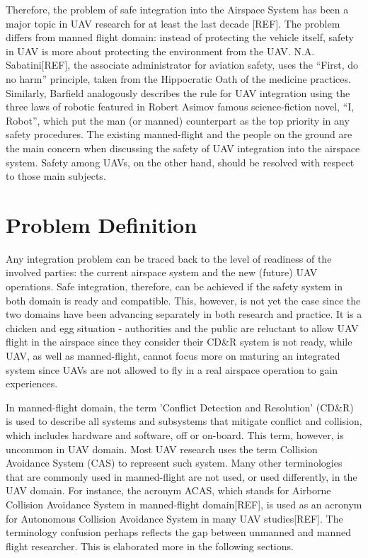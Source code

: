 Therefore, the problem of safe integration into the Airspace System has been a major topic in UAV research for at least the last decade [REF]. The problem differs from manned flight domain: instead of protecting the vehicle itself, safety in UAV is more about protecting the environment from the UAV. N.A. Sabatini[REF], the associate administrator for aviation safety, uses the “First, do no harm” principle, taken from the Hippocratic Oath of the medicine practices. Similarly, Barfield\cite{barfield:00} analogously describes the rule for UAV integration using the three laws of robotic featured in Robert Asimov famous science-fiction novel, “I, Robot”, which put the man (or manned) counterpart as the top priority in any safety procedures. The existing manned-flight and the people on the ground are the main concern when discussing the safety of UAV integration into the airspace system. Safety among UAVs, on the other hand, should be resolved with respect to those main subjects. 


\section{Problem Definition}
Any integration problem can be traced back to the level of readiness of the involved parties: the current airspace system and the new (future) UAV operations. Safe integration, therefore, can be achieved if the safety system in both domain is ready and compatible. This, however, is not yet the case since the two domains have been advancing separately in both research and practice. It is a chicken and egg situation - authorities and the public are reluctant to allow UAV flight in the airspace since they consider their CD\&R system is not ready, while UAV, as well as manned-flight, cannot focus more on maturing an integrated system since UAVs are not allowed to fly in a real airspace operation to gain experiences.

In manned-flight domain, the term 'Conflict Detection and Resolution' (CD\&R) is used to describe all systems and subsystems that mitigate conflict and collision, which includes hardware and software, off or on-board. This term, however, is uncommon in UAV domain. Most UAV research uses the term Collision Avoidance System (CAS) to represent such system. Many other terminologies that are commonly used in manned-flight are not used, or used differently, in the UAV domain. For instance, the acronym ACAS, which stands for Airborne Collision Avoidance System in manned-flight domain[REF], is used as an acronym for Autonomous Collision Avoidance System in many UAV studies[REF]. The terminology confusion perhaps reflects the gap between unmanned and manned flight researcher. This is elaborated more in the following sections.

